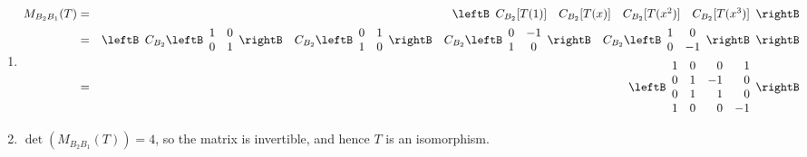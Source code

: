 \begin{solution}
\begin{enumerate}
\item 
\begin{eqnarray*}
M_{B_2B_1}(T) & = &
\leftB \begin{array}{cccc} C_{B_2}[T(1)] & C_{B_2}[T(x)] & C_{B_2}[T(x^2)]
& C_{B_2}[T(x^3)] \end{array}\rightB \\
& = & 
\leftB \begin{array}{cccc}
C_{B_2}\leftB\begin{array}{cc} 1 & 0 \\ 0 & 1 \end{array}\rightB 
& C_{B_2}\leftB\begin{array}{cc} 0 & 1 \\ 1 & 0 \end{array}\rightB
& C_{B_2}\leftB\begin{array}{cc} 0 & -1 \\ 1 & 0 \end{array}\rightB
& C_{B_2}\leftB\begin{array}{cc} 1 & 0 \\ 0 & -1 \end{array}\rightB
\end{array}\rightB \\
& = & \leftB\begin{array}{rrrr}
1 & 0 & 0 & 1 \\
0 & 1 & -1 & 0 \\
0 & 1 & 1 & 0 \\
1 & 0 & 0 & -1 \end{array}\rightB
\end{eqnarray*}

\item $\det(M_{B_2B_1}(T))=4$, so the matrix is invertible, and hence $T$
is an isomorphism.


\end{enumerate}
\end{solution}
